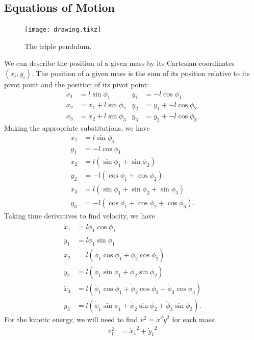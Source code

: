 \documentclass{article}
\begin{document}
\clearpage
\begin{appendices}

\section{Equations of Motion}

\begin{figure}
	\centering
	\texttt{[image: drawing.tikz]}
	\caption{The triple pendulum.}
\end{figure}

We can describe the position of a given mass by its Cartesian coordinates
$(x_i, y_i)$.  The position of a given mass is the sum of its position
relative to its pivot point and the position of its pivot point:
\begin{align}
	x_1 &= l\sin\phi_1     & y_1 &= -l\cos\phi_1 \\
	x_2 &= x_1+l\sin\phi_2 & y_2 &= y_1 + -l\cos\phi_2 \\
	x_3 &= x_2+l\sin\phi_3 & y_3 &= y_2 + -l\cos\phi_3.
\end{align}
Making the appropriate substitutions, we have
\begin{align}
	x_1 &= l\sin\phi_1     \\
	y_1 &= -l\cos\phi_1 \\
	x_2 &= l(\sin\phi_1+\sin\phi_2)  \\
	y_2 &= -l(\cos\phi_1+\cos\phi_2) \\
	x_3 &= l(\sin\phi_1+\sin\phi_2+\sin\phi_3)  \\
	y_3 &= -l(\cos\phi_1+\cos\phi_2+\cos\phi_3).
\end{align}
Taking time derivatives to find velocity, we have
\begin{align}
	\dot x_1 &= l\dot\phi_1\cos\phi_1 \\
	\dot y_1 &= l\dot\phi_1\sin\phi_1 \\
	\dot x_2 &= l(\dot\phi_1\cos\phi_1+\dot\phi_2\cos\phi_2) \\
	\dot y_2 &= l(\dot\phi_1\sin\phi_1+\dot\phi_2\sin\phi_2) \\
	\dot x_3 &= l(\dot\phi_1\cos\phi_1+\dot\phi_2\cos\phi_2
		+\dot\phi_3\cos\phi_3) \\
	\dot y_3 &= l(\dot\phi_1\sin\phi_1+\dot\phi_2\sin\phi_2
		+\dot\phi_3\sin\phi_3).
\end{align}
For the kinetic energy, we will need to find $v^2={\dot x}^2{\dot y}^2$ for
each mass. 
\begin{align}
	v_1^2 &= {\dot x_1}^2+{\dot y_1}^2 \\

\end{align}
\end{appendices}
\end{document}
